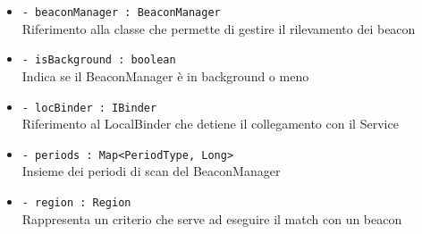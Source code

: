 \documentclass[../DefinizioneDiProdotto.tex]{subfiles}
\begin{document}
\begin{description}
\begin{itemize}
		\item \texttt{- beaconManager : BeaconManager}\\
		Riferimento alla classe che permette di gestire il rilevamento dei beacon
		
		\item \texttt{- isBackground : boolean}\\
		Indica se il BeaconManager è in background o meno
		
		\item \texttt{- locBinder : IBinder}\\
		Riferimento al LocalBinder che detiene il collegamento con il Service
		
		\item \texttt{- periods : Map<PeriodType, Long>}\\
		Insieme dei periodi di scan del BeaconManager
		
		\item \texttt{- region : Region}\\
		Rappresenta un criterio che serve ad eseguire il match con un beacon
		

\end{itemize}
\end{description}
\end{document}
